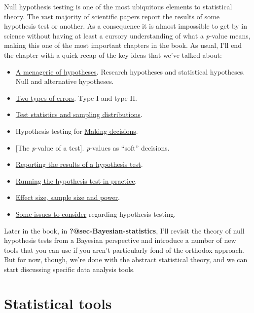 \documentclass[
  a4paper,
]{book}
\providecommand{\tightlist}{%
  \setlength{\itemsep}{0pt}\setlength{\parskip}{0pt}}\usepackage{longtable,booktabs,array}
\begin{document}
Null hypothesis testing is one of the most ubiquitous elements to
statistical theory. The vast majority of scientific papers report the
results of some hypothesis test or another. As a consequence it is
almost impossible to get by in science without having at least a cursory
understanding of what a \emph{p}-value means, making this one of the
most important chapters in the book. As usual, I'll end the chapter with
a quick recap of the key ideas that we've talked about:

\begin{itemize}
\tightlist
\item
  \protect\hyperlink{a-menagerie-of-hypotheses}{A menagerie of
  hypotheses}. Research hypotheses and statistical hypotheses. Null and
  alternative hypotheses.
\item
  \protect\hyperlink{two-types-of-errors}{Two types of errors}. Type I
  and type II.
\item
  \protect\hyperlink{test-statistics-and-sampling-distributions}{Test
  statistics and sampling distributions}.
\item
  Hypothesis testing for \protect\hyperlink{making-decisions}{Making
  decisions}.
\item
  {[}The \emph{p}-value of a test{]}. \emph{p}-values as ``soft''
  decisions.
\item
  \protect\hyperlink{reporting-the-results-of-a-hypothesis-test}{Reporting
  the results of a hypothesis test}.
\item
  \protect\hyperlink{running-the-hypothesis-test-in-practice}{Running
  the hypothesis test in practice}.
\item
  \protect\hyperlink{sec-Effect-size-sample-size-and-power}{Effect size,
  sample size and power}.
\item
  \protect\hyperlink{some-issues-to-consider}{Some issues to consider}
  regarding hypothesis testing.
\end{itemize}

Later in the book, in \textbf{?@sec-Bayesian-statistics}, I'll revisit
the theory of null hypothesis tests from a Bayesian perspective and
introduce a number of new tools that you can use if you aren't
particularly fond of the orthodox approach. But for now, though, we're
done with the abstract statistical theory, and we can start discussing
specific data analysis tools.

\part{Statistical tools}
\end{document}
